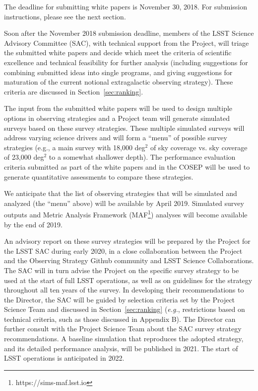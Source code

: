 \documentclass[DM,lsstdraft,toc,usenatbib]{lsstdoc}
\begin{document}
The deadline for submitting white papers is November 30, 2018. For submission instructions, 
please see the next section. 

Soon after the November 2018 submission deadline, members of the LSST Science Advisory Committee (SAC), 
with technical support from the Project, 
will triage the submitted white papers and decide which meet the criteria of scientific excellence and 
technical feasibility for further analysis (including suggestions for combining 
submitted ideas into single programs, and giving suggestions for maturation of the current notional 
extragalactic observing strategy). These criteria are discussed in Section~\ref{sec:ranking}. 

The input from the submitted white papers will be used to design multiple
options in observing strategies and a Project team will generate 
simulated surveys based on these survey strategies. 
These multiple simulated surveys will address varying science drivers and will form a 
``menu'' of possible survey strategies (e.g., a main 
survey with 18,000 deg$^2$ of sky coverage vs. sky coverage of 23,000 deg$^2$ to a
somewhat shallower depth). The performance evaluation criteria submitted as part of the 
white papers and in the COSEP will be used to generate quantitative assessments to compare these strategies. 

We anticipate that the list of observing strategies that will be simulated and analyzed 
(the ``menu'' above) will be available by April 2019. Simulated survey outputs and Metric Analysis 
Framework (MAF\footnote{https://sims-maf.lsst.io}) analyses will become available by the end 
of 2019. 

An advisory report on these survey strategies will be prepared by the Project for the LSST SAC during early 2020, 
in a close collaboration between the Project and the Observing Strategy Github community and 
LSST Science Collaborations. The SAC will in turn advise the Project on the specific survey strategy 
to be used at the start of full LSST operations, as well as on guidelines for the strategy throughout all ten years of the survey. 
In developing their recommendations to the Director, the SAC will be guided by selection 
criteria set by the Project Science Team and discussed in Section~\ref{sec:ranking} ({\it e.g.}, restrictions 
based on technical criteria, such as those discussed in Appendix B). The Director can further consult with the Project Science 
Team about the SAC survey strategy recommendations. A baseline simulation that reproduces the
adopted strategy, and its detailed performance analysis, will be published in 2021. 
The start of LSST operations is anticipated in 2022.
\end{document}

